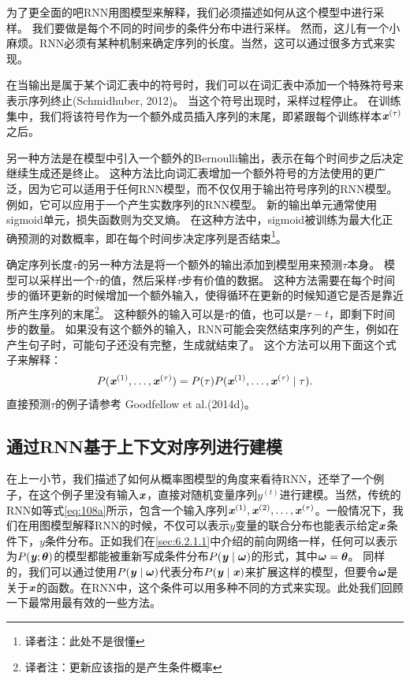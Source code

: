 为了更全面的吧RNN用图模型来解释，我们必须描述如何从这个模型中进行采样。
我们要做是每个不同的时间步的条件分布中进行采样。
然而，这儿有一个小麻烦。RNN必须有某种机制来确定序列的长度。当然，这可以通过很多方式来实现。

在当输出是属于某个词汇表中的符号时，我们可以在词汇表中添加一个特殊符号来表示序列终止(Schmidhuber, 2012)。
当这个符号出现时，采样过程停止。
在训练集中，我们将该符号作为一个额外成员插入序列的末尾，即紧跟每个训练样本$\boldsymbol{\mathit{x}}^{(\tau)}$之后。

另一种方法是在模型中引入一个额外的Bernoulli输出，表示在每个时间步之后决定继续生成还是终止。
这种方法比向词汇表增加一个额外符号的方法使用的更广泛，因为它可以适用于任何RNN模型，而不仅仅用于输出符号序列的RNN模型。
例如，它可以应用于一个产生实数序列的RNN模型。
新的输出单元通常使用sigmoid单元，损失函数则为交叉熵。
在这种方法中，sigmoid被训练为最大化正确预测的对数概率，即在每个时间步决定序列是否结束\footnote{译者注：此处不是很懂}。

确定序列长度$\tau$的另一种方法是将一个额外的输出添加到模型用来预测$\tau$本身。
模型可以采样出一个$\tau$的值，然后采样$\tau$步有价值的数据。
这种方法需要在每个时间步的循环更新的时候增加一个额外输入，使得循环在更新的时候知道它是否是靠近所产生序列的末尾\footnote{译者注：更新应该指的是产生条件概率}。
这种额外的输入可以是$\tau$的值，也可以是$\tau - t$，即剩下时间步的数量。
如果没有这个额外的输入，RNN可能会突然结束序列的产生，例如在产生句子时，可能句子还没有完整，生成就结束了。
这个方法可以用下面这个式子来解释：
\begin{align}
 P(\boldsymbol{\mathit{x}}^{(1)},\dots, \boldsymbol{\mathit{x}}^{(\tau)}) = P(\tau) P(\boldsymbol{\mathit{x}}^{(1)},\dots,\boldsymbol{\mathit{x}}^{(\tau)} \mid \tau) .
\end{align}
直接预测$\tau$的例子请参考 Goodfellow et al.(2014d)。

\subsection{通过RNN基于上下文对序列进行建模}
在上一小节，我们描述了如何从概率图模型的角度来看待RNN，还举了一个例子，在这个例子里没有输入$\boldsymbol{\mathit{x}}$，直接对随机变量序列$y^{(t)}$进行建模。当然，传统的RNN如等式\ref{eq:108a}所示，包含一个输入序列$\boldsymbol{\mathit{x}}^{(1)},\boldsymbol{\mathit{x}}^{(2)},\dots,\boldsymbol{\mathit{x}}^{(\tau)}$。一般情况下，我们在用图模型解释RNN的时候，不仅可以表示$y$变量的联合分布也能表示给定$\boldsymbol{\mathit{x}}$条件下，$y$条件分布。正如我们在\ref{sec:6.2.1.1}中介绍的前向网络一样，任何可以表示为$P(\boldsymbol{\mathit{y}};\boldsymbol{\theta})$的模型都能被重新写成条件分布$P(\boldsymbol{\mathit{y}} \mid \boldsymbol{\omega})$的形式，其中$\boldsymbol{\omega}=\boldsymbol{\theta}$。
同样的，我们可以通过使用$P(\boldsymbol{\mathit{y}} \mid \boldsymbol{\omega})$代表分布$P(\boldsymbol{\mathit{y}} \mid \boldsymbol{\mathit{x}})$来扩展这样的模型，但要令$\boldsymbol{\omega}$是关于$\boldsymbol{\mathit{x}}$的函数。在RNN中，这个条件可以用多种不同的方式来实现。此处我们回顾一下最常用最有效的一些方法。

